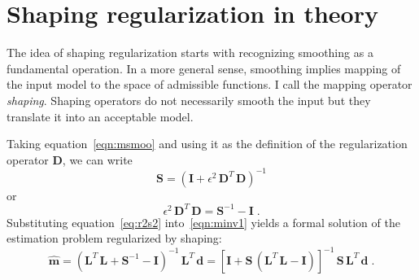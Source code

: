 


\section{Shaping regularization in theory}
The idea of shaping regularization starts with recognizing smoothing
as a fundamental operation. In a more general sense, smoothing implies
mapping of the input model to the space of admissible functions. I
call the mapping operator \emph{shaping}. Shaping operators do not
necessarily smooth the input but they translate it into an acceptable
model.

Taking equation~\ref{eqn:msmoo} and using it as the
definition of the regularization operator $\mathbf{D}$, we can write
\begin{equation}
  \label{eq:r2s}
  \mathbf{S} = \left(\mathbf{I} +
    \epsilon^2\,\mathbf{D}^T\,\mathbf{D}\right)^{-1}  
\end{equation}
or
\begin{equation}
  \label{eq:r2s2}
  \epsilon^2\,\mathbf{D}^T\,\mathbf{D} = \mathbf{S}^{-1} - \mathbf{I}\;.
\end{equation}
Substituting equation~\ref{eq:r2s2}
into~\ref{eqn:minv1} yields a formal solution of the
estimation problem regularized by shaping:
\begin{equation}
  \widehat{\mathbf{m}} = 
  \left(\mathbf{L}^T\,\mathbf{L} + \mathbf{S}^{-1} -
    \mathbf{I}\right)^{-1}\,\mathbf{L}^T\,\mathbf{d}
  = \left[\mathbf{I} + 
    \mathbf{S}\,\left(\mathbf{L}^T\,\mathbf{L} - \mathbf{I}\right)\right]^{-1}\,
  \mathbf{S}\,\mathbf{L}^T\,\mathbf{d}\;.
  \label{eqn:shape}  
\end{equation}

